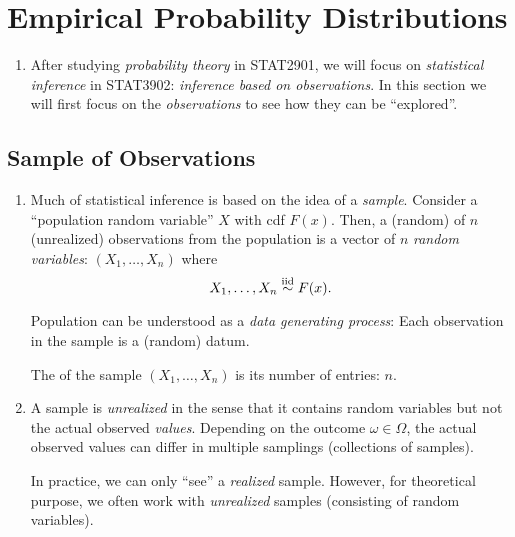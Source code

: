 \section{Empirical Probability Distributions}
\label{sect:empirical-prob-dist}
\begin{enumerate}
\item After studying \emph{probability theory} in STAT2901, we will focus on
\emph{statistical inference} in STAT3902: \emph{inference based on
observations}. In this section we will first focus on the \emph{observations} to
see how they can be ``explored''.
\end{enumerate}
\subsection{Sample of Observations}
\begin{enumerate}
\item Much of statistical inference is based on the idea of a \emph{sample}.
Consider a ``population random variable'' \(X\) with cdf \(F(x)\). Then, a
(random)  of \(n\) (unrealized) observations from the population
is a vector of \(n\) \emph{random variables}: \((X_1,\dotsc,X_n)\) where
\[
X_1,\dotsc,X_n\overset{\text{iid}}{\sim} F(x).
\]
\begin{center}
\end{center}
\begin{intuition}
Population can be understood as a \emph{data generating process}: Each
observation in the sample is a (random) datum.
\end{intuition}

\begin{note}
The  of the sample \((X_1,\dotsc,X_n)\) is its number of
entries: \(n\).
\end{note}
\item A sample is \emph{unrealized} in the sense that it contains random
variables but not the actual observed \emph{values}. Depending on the outcome
\(\omega\in\Omega\), the actual observed values can differ in multiple
samplings (collections of samples).

In practice, we can only ``see''  a \emph{realized} sample. However, for
theoretical purpose, we often work with \emph{unrealized} samples (consisting of
random variables).
\end{enumerate}


